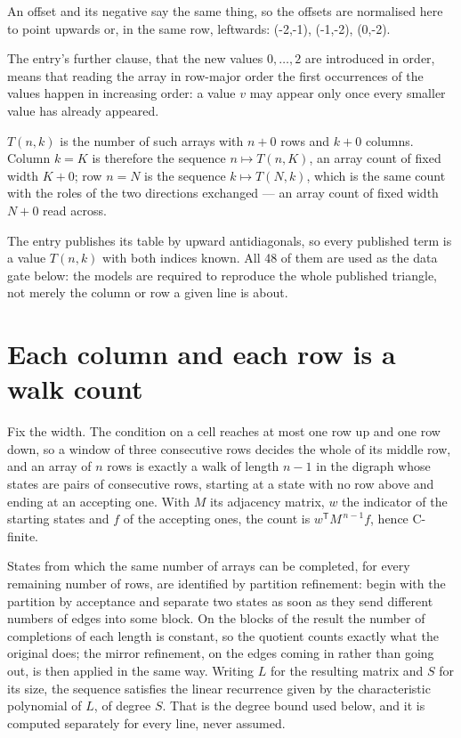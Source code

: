 \documentclass[11pt]{article}
\theoremstyle{definition}
\begin{document}
An offset and its negative say the same thing, so the offsets are normalised here to point upwards or, in the same row, leftwards: (-2,-1), (-1,-2), (0,-2).

The entry's further clause, that the new values $0,\dots,2$ are introduced in order, means that reading the array in row-major order the first occurrences of the values happen in increasing order: a value $v$ may appear only once every smaller value has already appeared.

$T(n,k)$ is the number of such arrays with $n + 0$ rows and $k + 0$ columns. Column $k = K$ is therefore the sequence $n \mapsto T(n,K)$, an array count of fixed width $K + 0$; row $n = N$ is the sequence $k \mapsto T(N,k)$, which is the same count with the roles of the two directions exchanged --- an array count of fixed width $N + 0$ read across.

The entry publishes its table by upward antidiagonals, so every published term is a value $T(n,k)$ with both indices known. All 48 of them are used as the data gate below: the models are required to reproduce the whole published triangle, not merely the column or row a given line is about.

\section{Each column and each row is a walk count}

Fix the width. The condition on a cell reaches at most one row up and one row down, so a window of three consecutive rows decides the whole of its middle row, and an array of $n$ rows is exactly a walk of length $n-1$ in the digraph whose states are pairs of consecutive rows, starting at a state with no row above and ending at an accepting one. With $M$ its adjacency matrix, $w$ the indicator of the starting states and $f$ of the accepting ones, the count is $w^{\mathsf T}M^{\,n-1}f$, hence C-finite.

States from which the same number of arrays can be completed, for every remaining number of rows, are identified by partition refinement: begin with the partition by acceptance and separate two states as soon as they send different numbers of edges into some block. On the blocks of the result the number of completions of each length is constant, so the quotient counts exactly what the original does; the mirror refinement, on the edges coming in rather than going out, is then applied in the same way. Writing $L$ for the resulting matrix and $S$ for its size, the sequence satisfies the linear recurrence given by the characteristic polynomial of $L$, of degree $S$. That is the degree bound used below, and it is computed separately for every line, never assumed.
\end{document}
